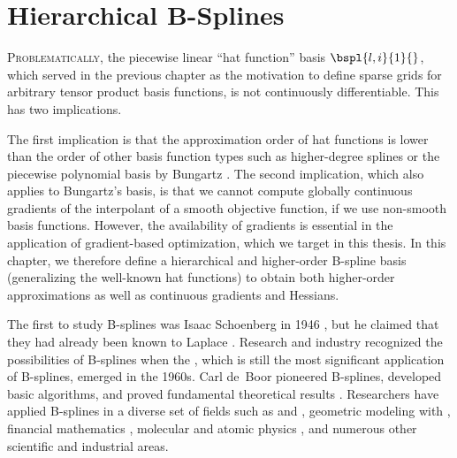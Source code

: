 
\chapter{Hierarchical B-Splines}
\label{chap:30BSplines}

\lettrine{P}{roblematically,}
the piecewise linear ``hat function'' basis $\bspl{l,i}{1}{}$,
which served in the previous chapter as the motivation
to define sparse grids for arbitrary tensor product basis functions,
is not continuously differentiable.
This has two implications.


The first implication is that the approximation order of hat functions
is lower than the order of other basis function types
such as higher-degree splines \cite{Sickel11Spline}
or the piecewise polynomial basis by Bungartz \cite{Bungartz98Finite}.
The second implication, which also applies to Bungartz's basis,
is that we cannot compute globally continuous gradients of the
interpolant of a smooth objective function,
if we use non-smooth basis functions.
However, the availability of gradients is
essential in the application of gradient-based optimization,
which we target in this thesis.
In this chapter, we therefore define a hierarchical and
higher-order B-spline basis
(generalizing the well-known hat functions)
to obtain both higher-order approximations
as well as continuous gradients and Hessians.

The first to study B-splines was Isaac Schoenberg in 1946
\cite{Schoenberg46Contributions},
but he claimed that they had already been known to Laplace
\cite{Boor76Splines}.
Research and industry recognized the possibilities of B-splines when
the \fem, which is still the most significant application of B-splines,
emerged in the 1960s.
Carl de~Boor pioneered B-splines, developed basic algorithms, and
proved fundamental theoretical results \cite{Boor72Calculating}.
Researchers have applied B-splines in a diverse set of fields such as
\fem \cite{Hoellig03Finite} and \iga \cite{Hoellig12Finite},
geometric modeling with \nurbs
{},
financial mathematics \cite{Pflueger10Spatially},
molecular and atomic physics
,
and numerous other scientific and industrial areas.

